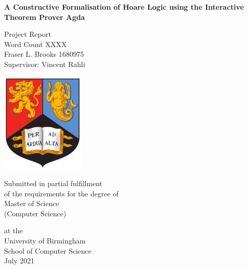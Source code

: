 \documentclass[oneside,12pt]{article}
\begin{document}
\begin{titlepage}
  \begin{center}
    \large

    \textbf{\Large A Constructive Formalisation of Hoare Logic using the Interactive Theorem Prover Agda}

    
    \vfill

    Project Report \\
    Word Count XXXX   \\
    Fraser L. Brooks 1680975 \\
    Supervisor: Vincent Rahli
    
    \vfill
    \includegraphics[width=4cm]{Figures/birmingham_shield.png}
    \vfill
       
    Submitted in partial fulfillment \\
    of the requirements for the degree of\\
    Master of Science \\
    (Computer Science) \\
       
    \vfill
       
    at the \\
    University of Birmingham\\
    School of Computer Science\\
    July 2021
       
    \vspace{0.8cm}
       
  \end{center}
\end{titlepage}

\flushbottom
\end{document}
